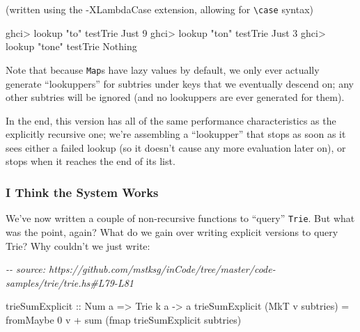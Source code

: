 \documentclass[]{article}
\newenvironment{Shaded}{}{}
\newcommand{\CommentTok}[1]{\textcolor[rgb]{0.38,0.63,0.69}{\textit{#1}}}
\newcommand{\DataTypeTok}[1]{\textcolor[rgb]{0.56,0.13,0.00}{#1}}
\newcommand{\DecValTok}[1]{\textcolor[rgb]{0.25,0.63,0.44}{#1}}
\newcommand{\FunctionTok}[1]{\textcolor[rgb]{0.02,0.16,0.49}{#1}}
\newcommand{\NormalTok}[1]{#1}
\newcommand{\OperatorTok}[1]{\textcolor[rgb]{0.40,0.40,0.40}{#1}}
\newcommand{\OtherTok}[1]{\textcolor[rgb]{0.00,0.44,0.13}{#1}}
\newcommand{\StringTok}[1]{\textcolor[rgb]{0.25,0.44,0.63}{#1}}
\begin{document}
(written using the -XLambdaCase extension, allowing for
\texttt{\textbackslash{}case} syntax)

\begin{Shaded}
\begin{Highlighting}[]
\NormalTok{ghci}\OperatorTok{\textgreater{}} \FunctionTok{lookup} \StringTok{"to"}\NormalTok{ testTrie}
\DataTypeTok{Just} \DecValTok{9}
\NormalTok{ghci}\OperatorTok{\textgreater{}} \FunctionTok{lookup} \StringTok{"ton"}\NormalTok{ testTrie}
\DataTypeTok{Just} \DecValTok{3}
\NormalTok{ghci}\OperatorTok{\textgreater{}} \FunctionTok{lookup} \StringTok{"tone"}\NormalTok{ testTrie}
\DataTypeTok{Nothing}
\end{Highlighting}
\end{Shaded}

Note that because \texttt{Map}s have lazy values by default, we only ever
actually generate ``lookuppers'' for subtries under keys that we eventually
descend on; any other subtries will be ignored (and no lookuppers are ever
generated for them).

In the end, this version has all of the same performance characteristics as the
explicitly recursive one; we're assembling a ``lookupper'' that stops as soon as
it sees either a failed lookup (so it doesn't cause any more evaluation later
on), or stops when it reaches the end of its list.

\subsubsection{I Think the System Works}\label{i-think-the-system-works}

We've now written a couple of non-recursive functions to ``query''
\texttt{Trie}. But what was the point, again? What do we gain over writing
explicit versions to query Trie? Why couldn't we just write:

\begin{Shaded}
\begin{Highlighting}[]
\CommentTok{{-}{-} source: https://github.com/mstksg/inCode/tree/master/code{-}samples/trie/trie.hs\#L79{-}L81}

\OtherTok{trieSumExplicit ::} \DataTypeTok{Num}\NormalTok{ a }\OtherTok{=\textgreater{}} \DataTypeTok{Trie}\NormalTok{ k a }\OtherTok{{-}\textgreater{}}\NormalTok{ a}
\NormalTok{trieSumExplicit (}\DataTypeTok{MkT}\NormalTok{ v subtries) }\OtherTok{=}
\NormalTok{    fromMaybe }\DecValTok{0}\NormalTok{ v }\OperatorTok{+} \FunctionTok{sum}\NormalTok{ (}\FunctionTok{fmap}\NormalTok{ trieSumExplicit subtries)}
\end{Highlighting}
\end{Shaded}
\end{document}
